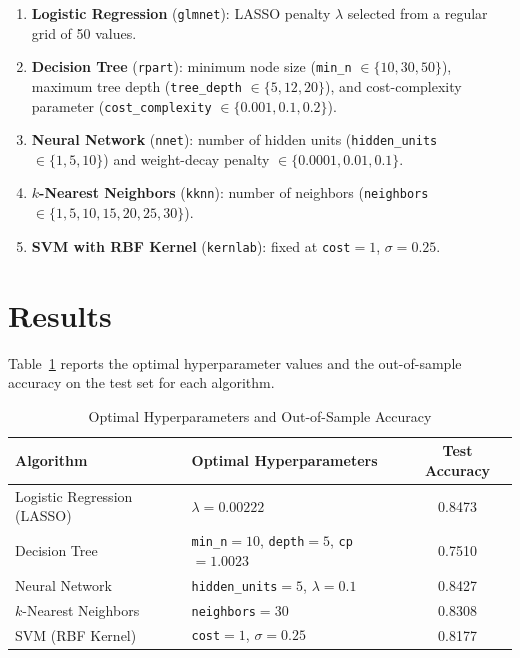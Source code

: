 \documentclass[12pt]{article}
\begin{document}
\begin{enumerate}
    \item \textbf{Logistic Regression} (\texttt{glmnet}): LASSO penalty $\lambda$ selected from a regular grid of 50 values.
    \item \textbf{Decision Tree} (\texttt{rpart}): minimum node size (\texttt{min\_n} $\in \{10, 30, 50\}$), maximum tree depth (\texttt{tree\_depth} $\in \{5, 12, 20\}$), and cost-complexity parameter (\texttt{cost\_complexity} $\in \{0.001, 0.1, 0.2\}$).
    \item \textbf{Neural Network} (\texttt{nnet}): number of hidden units (\texttt{hidden\_units} $\in \{1, 5, 10\}$) and weight-decay penalty $\in \{0.0001, 0.01, 0.1\}$.
    \item \textbf{$k$-Nearest Neighbors} (\texttt{kknn}): number of neighbors (\texttt{neighbors} $\in \{1, 5, 10, 15, 20, 25, 30\}$).
    \item \textbf{SVM with RBF Kernel} (\texttt{kernlab}): fixed at \texttt{cost}$=1$, $\sigma=0.25$.
\end{enumerate}

\section*{Results}

Table~\ref{tab:results} reports the optimal hyperparameter values and the out-of-sample accuracy on the test set for each algorithm.

\begin{table}[h!]
\centering
\caption{Optimal Hyperparameters and Out-of-Sample Accuracy}
\label{tab:results}
\begin{tabular}{llc}
\toprule
\textbf{Algorithm} & \textbf{Optimal Hyperparameters} & \textbf{Test Accuracy} \\
\midrule
Logistic Regression (LASSO) & $\lambda = 0.00222$ & 0.8473 \\
Decision Tree               & \texttt{min\_n}$=10$, \texttt{depth}$=5$, \texttt{cp}$=1.0023$ & 0.7510 \\
Neural Network              & \texttt{hidden\_units}$=5$, $\lambda=0.1$ & 0.8427 \\
$k$-Nearest Neighbors       & \texttt{neighbors}$=30$ & 0.8308 \\
SVM (RBF Kernel)            & \texttt{cost}$=1$, $\sigma=0.25$ & 0.8177 \\
\bottomrule
\end{tabular}
\end{table}
\end{document}
